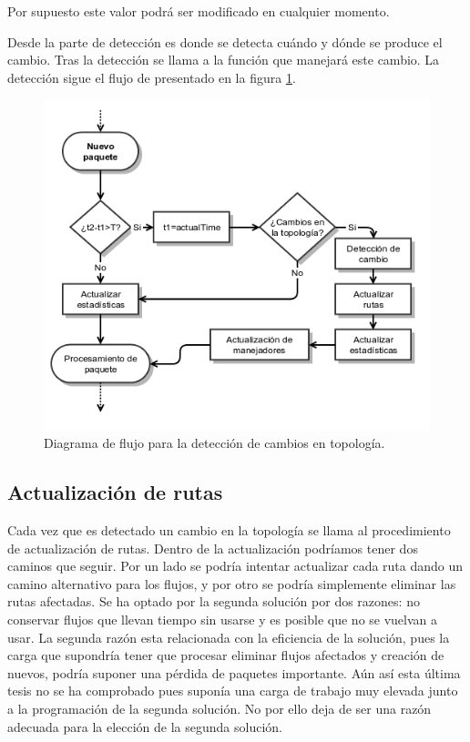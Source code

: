 \documentclass[a4paper,11pt]{book}
\begin{document}
Por supuesto este valor podrá ser modificado en cualquier momento.

Desde la parte de detección es donde se detecta cuándo y dónde se produce el cambio. Tras la detección se llama a la función que manejará este cambio. La detección sigue el flujo de presentado en la figura \ref{detection}.

\begin{figure}[tb]
\centering
\includegraphics[scale=0.8]{./figuras/detection}
\caption{Diagrama de flujo para la detección de cambios en topología.}\label{detection}
\end{figure}


%
\subsection{Actualización de rutas}

 Cada vez que es detectado un cambio en la topología se llama al procedimiento de actualización de rutas. Dentro de la actualización podríamos tener dos caminos que seguir. Por un lado se podría intentar actualizar cada ruta dando un camino alternativo para los flujos, y por otro se podría simplemente eliminar las rutas afectadas. Se ha optado por la segunda solución por dos razones: no conservar flujos que llevan tiempo sin usarse y es posible que no se vuelvan a usar. La segunda razón esta relacionada con la eficiencia de la solución, pues la carga que supondría tener que procesar eliminar flujos afectados y creación de nuevos, podría suponer una pérdida de paquetes importante. Aún así esta última tesis no se ha comprobado pues suponía una carga de trabajo muy elevada junto a la programación de la segunda solución. No por ello deja de ser una razón adecuada para la elección de la segunda solución. 
\end{document}

